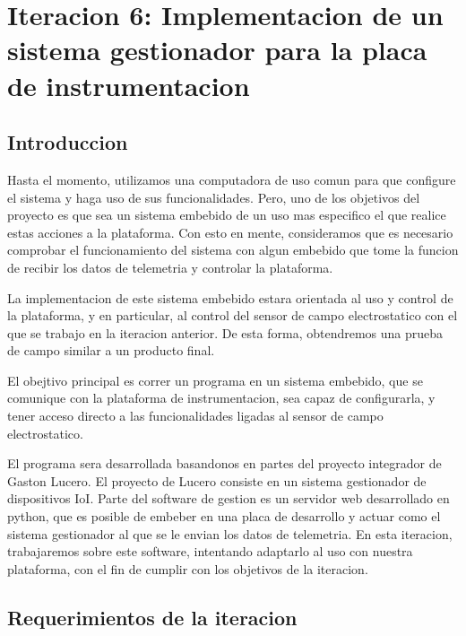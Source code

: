 \chapter{Iteracion 6: Implementacion de un sistema gestionador para la placa de instrumentacion} %
\label{cha:iteracion_7}

\section{Introduccion} %
\label{it7:sec:introduccion}

Hasta el momento, utilizamos una computadora de uso comun para que configure el sistema y haga uso de sus funcionalidades. Pero, uno de los objetivos del proyecto es que sea un sistema embebido de un uso mas especifico el que realice estas acciones a la plataforma. Con esto en mente, consideramos que es necesario comprobar el funcionamiento del sistema con algun embebido que tome la funcion de recibir los datos de telemetria y controlar la plataforma.

La implementacion de este sistema embebido estara orientada al uso y control de la plataforma, y en particular, al control del sensor de campo electrostatico con el que se trabajo en la iteracion anterior. De esta forma, obtendremos una prueba de campo similar a un producto final.

El obejtivo principal es correr un programa en un sistema embebido, que se comunique con la plataforma de instrumentacion, sea capaz de configurarla, y tener acceso directo a las funcionalidades ligadas al sensor de campo electrostatico.

El programa sera desarrollada basandonos en partes del proyecto integrador de Gaston Lucero. El proyecto de Lucero consiste en un sistema gestionador de dispositivos IoI. Parte del software de gestion es un servidor web desarrollado en python, que es posible de embeber en una placa de desarrollo y actuar como el sistema gestionador al que se le envian los datos de telemetria. En esta iteracion, trabajaremos sobre este software, intentando adaptarlo al uso con nuestra plataforma, con el fin de cumplir con los objetivos de la iteracion.


\section{Requerimientos de la iteracion} %
\label{it7:sec:requerimientos_de_la_iteracion}

